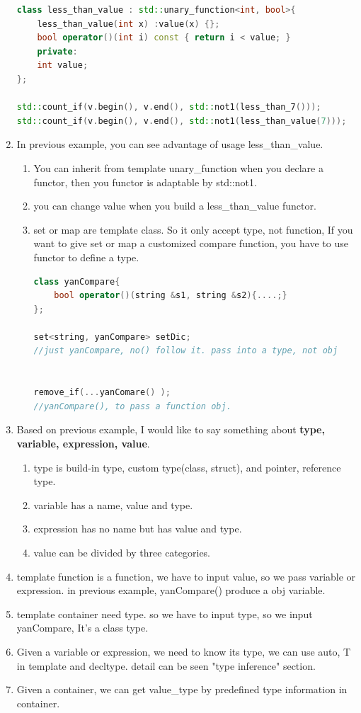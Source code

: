 \documentclass[a4paper,11pt,twoside]{book}
\begin{document}
\begin{enumerate}
\begin{lstlisting}[frame=single, language=c++]
class less_than_value : std::unary_function<int, bool>{
    less_than_value(int x) :value(x) {};
    bool operator()(int i) const { return i < value; }
    private:
    int value;
};

std::count_if(v.begin(), v.end(), std::not1(less_than_7()));
std::count_if(v.begin(), v.end(), std::not1(less_than_value(7)));
\end{lstlisting}


   \item In previous example, you can see advantage of usage less\_than\_value.
   \begin{enumerate}
   \item You can inherit from  template unary\_function when you declare a functor, then you functor is adaptable by std::not1.

   \item you can change value when you build a less\_than\_value functor.

   \item set or map are template class. So it only accept type, not function, If you want to give set or map a customized compare function,  you have to use functor to define a type.
\begin{lstlisting}[frame=single, language=c++]
class yanCompare{
    bool operator()(string &s1, string &s2){....;}
};

set<string, yanCompare> setDic;
//just yanCompare, no() follow it. pass into a type, not obj


remove_if(...yanComare() );
//yanCompare(), to pass a function obj.
 \end{lstlisting}
\end{enumerate}

\item Based on previous example, I would like to say something about \textbf{type, variable, expression, value}.
\begin{enumerate}
\item type is build-in type, custom type(class, struct), and pointer, reference type.
\item variable has a name, value and type.
\item expression has no name but has value and type.
\item value can be divided by three categories.
\end{enumerate}
\item template function is a function, we have to input value, so we pass variable or expression. in previous example, yanCompare() produce a obj variable.
\item template container need type. so we have to input type, so we input yanCompare, It's a class type.
\item Given a variable or expression, we need to know its type, we can use auto, T in template and decltype. detail can be seen "type inference" section.
\item Given a container, we can get value\_type by predefined type information in container.


\end{enumerate}
\end{document}
